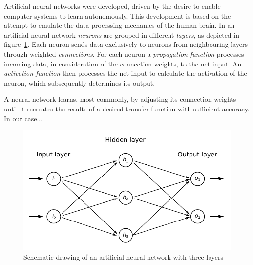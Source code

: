 \documentclass[12pt]{scrartcl}
\begin{document}
Artificial neural networks were developed, driven by the desire to enable computer systems to learn autonomously.
This development is based on the attempt to emulate the data processing mechanics of the human brain. %
In an artificial neural network \emph{neurons} are grouped in different \emph{layers}, as depicted in figure~\ref{fig:neuralnetwork}. 
Each neuron sends data exclusively to neurons from neighbouring layers through weighted \emph{connections}.
For each neuron a \emph{propagation function} processes incoming data, in consideration of the connection weights, to the net input.
An \emph{activation function} then processes the net input to calculate the activation of the neuron, which subsequently determines its output. \cite{KrieselNN}

A neural network learns, most commonly, by adjusting its connection weights until it recreates the results of a desired transfer function with sufficient accuracy.
In our case...

\begin{figure}[h]
    \centering
    \includegraphics{figures/neuralnetworks.pdf}
    \caption{Schematic drawing of an artificial neural network with three layers}
    \label{fig:neuralnetwork}
\end{figure}

\end{document}
